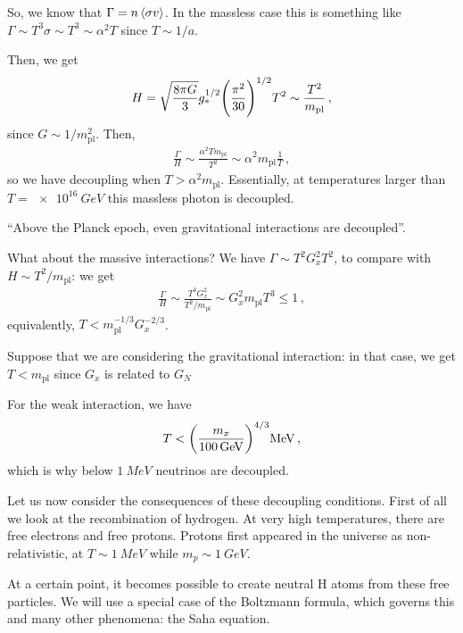 \documentclass[main.tex]{subfiles}
\begin{document}
So, we know that \(\Gamma = n \expval{\sigma v}\). In the massless case this is something like \(\Gamma \sim T^3 \sigma \sim T^{3} \sim \alpha^2 T\) since \(T \sim 1/ a\).

Then, we get 
%
\begin{align}
  H = \sqrt{\frac{8 \pi G }{3}} g_{*}^{1/2} \qty(\frac{\pi^2}{30})^{1/2} T^2 \sim \frac{T^2}{m _{\text{pl}}}
\,,
\end{align}
%
since \(G \sim 1/m _{\text{pl}}^2\). Then, 
%
\begin{align}
  \frac{\Gamma}{H} \sim \frac{\alpha^2 T m _{\text{pl}}}{T^2} \sim \alpha^2 m _{\text{pl}} \frac{1}{T}
\,,
\end{align}
%
so we have decoupling when \(T > \alpha^2 m _{\text{pl}}\).
Essentially, at temperatures larger than \(T = \SI{e16}{GeV}\) this massless photon is decoupled.

``Above the Planck epoch, even gravitational interactions are decoupled''.

What about the massive interactions? We have \(\Gamma \sim T^2 G_x^2 T^2\), to compare with \(H \sim T^2/ m _{\text{pl}}\): we get 
%
\begin{align}
  \frac{\Gamma}{H} \sim \frac{T^3 G_x^2}{T^2 / m _{\text{pl}}} \sim G_x^2 m _{\text{pl}} T^3 \leq 1
\,,
\end{align}
%
equivalently, \(T < m _{\text{pl}}^{-1/3} G_x^{-2/3}\).

Suppose that we are considering the gravitational interaction: in that case, we get \(T < m _{\text{pl}}\) since \(G_x\) is related to \( G_N\) 


For the weak interaction, we have 
%
\begin{align}
    T < \qty(\frac{m_x}{\SI{100}{GeV}})^{4/3} \SI{}{MeV}
\,,
\end{align}
%
which is why below \(\SI{1}{MeV}\) neutrinos are decoupled.

Let us now consider the consequences of these decoupling conditions.
First of all we look at the recombination of hydrogen.
At very high temperatures, there are free electrons and free protons.
Protons first appeared in the universe as non-relativistic, at \(T \sim \SI{1}{MeV}\) while \(m_p \sim \SI{1}{GeV}\).

At a certain point, it becomes possible to create neutral H atoms from these free particles.
We will use a special case of the Boltzmann formula, which governs this and many other phenomena: the Saha equation.
\end{document}
